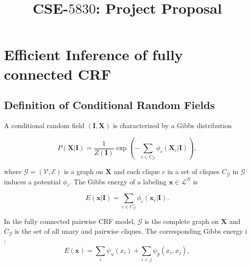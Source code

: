 \documentclass{article}
\numberwithin{equation}{section}
\newcommand{\1}{\boldsymbol{1}}
\begin{document}
\title[Title of the presentation]{CSE-$5830$: Project Proposal}


\section{Efficient Inference of fully connected CRF}
\subsection{Definition of Conditional Random Fields}
A conditional random field $(\mathbf{I}, \mathbf{X})$ is characterized by a Gibbs distribution

\[
P(\mathbf{X}|\mathbf{I}) = \frac{1}{Z(\mathbf{I})} \exp\left( - \sum_{c \in C_{\mathcal{G}}} \phi_c(\mathbf{X}_c|\mathbf{I}) \right),
\]

where $\mathcal{G} = (\mathcal{V}, \mathcal{E})$ is a graph on $\mathbf{X}$ and each clique $c$ in a set of cliques $C_{\mathcal{G}}$ in $\mathcal{G}$ induces a potential $\phi_c$. The Gibbs energy of a labeling $\mathbf{x} \in \mathcal{L}^N$ is

\[
E(\mathbf{x}|\mathbf{I}) = \sum_{c \in C_{\mathcal{G}}} \phi_c(\mathbf{x}_c|\mathbf{I}).
\]


In the fully connected pairwise CRF model, $\mathcal{G}$ is the complete graph on $\mathbf{X}$ and $C_{\mathcal{G}}$ is the set of all unary and pairwise cliques. The corresponding Gibbs energy i : 
\[
E(\mathbf{x}) = \sum_i \psi_u(x_i) + \sum_{i < j} \psi_p(x_i, x_j),
\]
\end{document}
